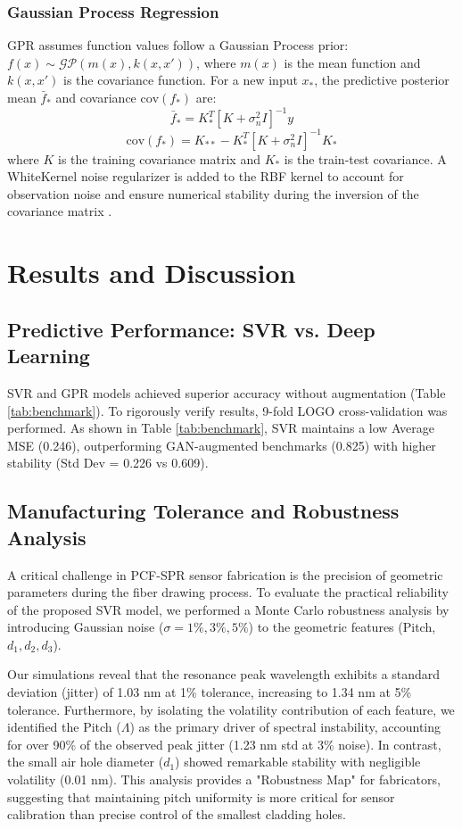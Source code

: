 \documentclass[conference]{IEEEtran}
\begin{document}
\subsubsection{Gaussian Process Regression}
GPR assumes function values follow a Gaussian Process prior: $f(x) \sim \mathcal{GP}(m(x), k(x, x'))$, where $m(x)$ is the mean function and $k(x, x')$ is the covariance function. For a new input $x_*$, the predictive posterior mean $\bar{f}_*$ and covariance $\text{cov}(f_*)$ are:
\begin{equation}
\bar{f}_* = K_*^T [K + \sigma_n^2 I]^{-1} y
\end{equation}
\begin{equation}
\text{cov}(f_*) = K_{**} - K_*^T [K + \sigma_n^2 I]^{-1} K_*
\end{equation}
where $K$ is the training covariance matrix and $K_*$ is the train-test covariance. A WhiteKernel noise regularizer is added to the RBF kernel to account for observation noise and ensure numerical stability during the inversion of the covariance matrix \cite{b7}.

\section{Results and Discussion}

\subsection{Predictive Performance: SVR vs. Deep Learning}
SVR and GPR models achieved superior accuracy without augmentation (Table \ref{tab:benchmark}). To rigorously verify results, 9-fold LOGO cross-validation was performed. As shown in Table \ref{tab:benchmark}, SVR maintains a low Average MSE (0.246), outperforming GAN-augmented benchmarks (0.825) with higher stability (Std Dev = 0.226 vs 0.609).


\subsection{Manufacturing Tolerance and Robustness Analysis}
A critical challenge in PCF-SPR sensor fabrication is the precision of geometric parameters during the fiber drawing process. To evaluate the practical reliability of the proposed SVR model, we performed a Monte Carlo robustness analysis by introducing Gaussian noise ($\sigma = 1\%, 3\%, 5\%$) to the geometric features (Pitch, $d_1, d_2, d_3$). 

Our simulations reveal that the resonance peak wavelength exhibits a standard deviation (jitter) of 1.03 nm at 1\% tolerance, increasing to 1.34 nm at 5\% tolerance. Furthermore, by isolating the volatility contribution of each feature, we identified the Pitch ($\Lambda$) as the primary driver of spectral instability, accounting for over 90\% of the observed peak jitter (1.23 nm std at 3\% noise). In contrast, the small air hole diameter ($d_1$) showed remarkable stability with negligible volatility (0.01 nm). This analysis provides a "Robustness Map" for fabricators, suggesting that maintaining pitch uniformity is more critical for sensor calibration than precise control of the smallest cladding holes.
\end{document}
